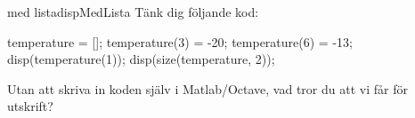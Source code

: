 \begin{matteovning}{ med lista}{dispMedLista}
Tänk dig följande kod:
\vspace{10pt}
\begin{matlab}
temperature = [];
temperature(3) = -20;
temperature(6) = -13;
disp(temperature(1));
disp(size(temperature, 2));
\end{matlab}
Utan att skriva in koden själv i Matlab/Octave, vad tror du att vi får för utskrift?
\end{matteovning}


